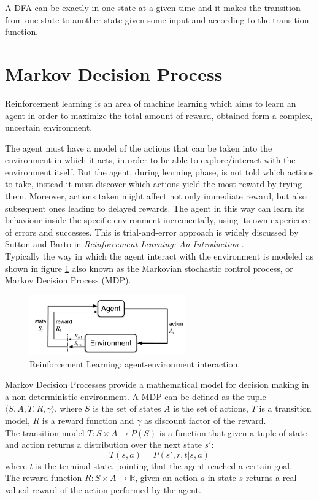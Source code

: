 \documentclass{article}
\newcommand{\R}{\mathbb{R}} %
\begin{document}
A DFA can be exactly in one state at a given time and it makes the transition from one state to another state given some input and according to the transition function.


\section {Markov Decision Process} %

Reinforcement learning is an area of machine learning which aims to learn an agent in order to maximize the total amount of reward, obtained form a complex, uncertain environment. 

The agent must have a model of the actions that can be taken into the environment in which it acts, in order to be able to explore/interact with the environment itself. But the agent, during learning phase, is not told which actions to take, instead it must discover which actions yield the most reward by trying them. Moreover, actions taken might affect not only immediate reward, but also subsequent ones leading to delayed rewards. The agent in this way can learn its behaviour inside the specific environment incrementally, using its own experience of errors and successes.
This is trial-and-error approach is widely discussed by Sutton and Barto in \textit{Reinforcement Learning: An Introduction} \cite{sutton2018rl}.
\\
Typically the way in which the agent interact with the environment is modeled as shown in figure \ref{fig:RL} also known as the Markovian stochastic control process, or Markov Decision Process (MDP).
\begin{figure}[h]
	\centering
	\includegraphics[width=0.6\textwidth]{images/rl_sutton_barto.png}
	\caption{Reinforcement Learning: agent-environment interaction.}
	\label{fig:RL}
\end{figure}

Markov Decision Processes provide a mathematical model for decision making in a non-deterministic environment. A MDP can be defined as the tuple $\langle S, A, T, R, \gamma \rangle$, where $S$ is the set of states $A$ is the set of actions, $T$ is a transition model, $R$ is a reward function and $\gamma$ as discount factor of the reward. 
\\
The transition model $T : S \times A \rightarrow P(S)$ is a function that given a tuple of state and action returns a distribution over the next state $s'$:
\begin{equation}
    T(s,a) = P(s',r,t|s,a)
\end{equation}
where $t$ is the terminal state, pointing that the agent reached a certain goal.
\\
The reward function $R : S \times A \rightarrow \R$, given an action $a$ in state $s$ returns a real valued reward of the action performed by the agent.
\end{document}
